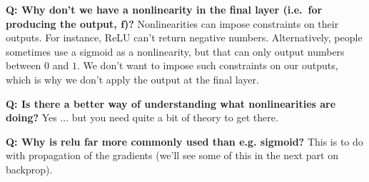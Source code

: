 \documentclass{article}
\newcommand{\f}{\mathbf{f}}
\begin{document}
\textbf{Q: Why don't we have a nonlinearity in the final layer (i.e.\ for producing the output, $\f$)?}
Nonlinearities can impose constraints on their outputs.
For instance, ReLU can't return negative numbers.
Alternatively, people sometimes use a sigmoid as a nonlinearity, but that can only output numbers between $0$ and $1$.
We don't want to impose such constraints on our outputs, which is why we don't apply the output at the final layer.

\textbf{Q: Is there a better way of understanding what nonlinearities are doing?}
Yes ... but you need quite a bit of theory to get there.

\textbf{Q: Why is relu far more commonly used than e.g. sigmoid?}
This is to do with propagation of the gradients (we'll see some of this in the next part on backprop).
\end{document}
